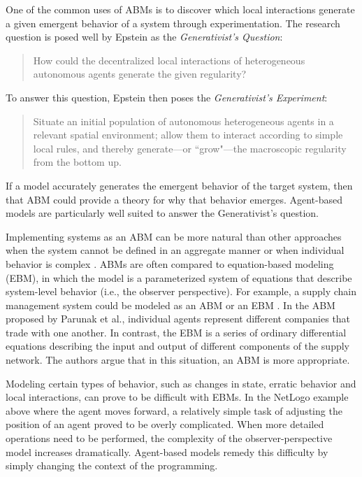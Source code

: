 One of the common uses of ABMs is to discover which local interactions generate a given emergent behavior of a system through experimentation.
The research question is posed well by Epstein as the \textit{Generativist's Question}:
\begin{quote}
   How could the decentralized local interactions of heterogeneous autonomous agents generate the given regularity?
\end{quote}
To answer this question, Epstein then poses the \textit{Generativist's Experiment}:
\begin{quote}
Situate an initial population of autonomous heterogeneous agents in a relevant spatial environment; allow them to interact according to simple local rules, and thereby generate---or ``grow"---the macroscopic regularity from the bottom up. \cite{epstein1999agent}
\end{quote}
If a model accurately generates the emergent behavior of the target system, then that ABM could provide a theory for why that behavior emerges.
Agent-based models are particularly well suited to answer the Generativist's question.



Implementing systems as an ABM can be more natural than other approaches when the system cannot be defined in an aggregate manner or when individual behavior is complex \cite{bonabeau2002agent}.
ABMs are often compared to equation-based modeling (EBM), in which the model is a parameterized system of equations that describe system-level behavior (i.e., the observer perspective).
For example, a supply chain management system could be modeled as an ABM or an EBM \cite{parunak1998agent}.
In the ABM proposed by Parunak et al., individual agents represent different companies that trade with one another.
In contrast, the EBM is a series of ordinary differential equations describing the input and output of different components of the supply network.
The authors argue that in this situation, an ABM is more appropriate.

Modeling certain types of behavior, such as changes in state, erratic behavior and local interactions, can prove to be difficult with EBMs.
In the NetLogo example above where the agent moves forward, a relatively simple task of adjusting the position of an agent proved to be overly complicated.
When more detailed operations need to be performed, the complexity of the observer-perspective model increases dramatically.
Agent-based models remedy this difficulty by simply changing the context of the programming.


